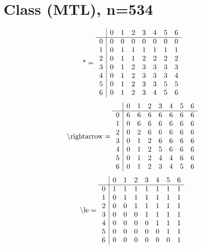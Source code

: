 \documentclass[11pt]{article}
\begin{document}
\section{Class (MTL), n=534}
\[\text{*} = 
\begin{array}{r | r r r r r r r}
 & 0 & 1 & 2 & 3 & 4 & 5 & 6 \\ \hline
0 & 0 & 0 & 0 & 0 & 0 & 0 & 0 \\
1 & 0 & 1 & 1 & 1 & 1 & 1 & 1 \\
2 & 0 & 1 & 1 & 2 & 2 & 2 & 2 \\
3 & 0 & 1 & 2 & 3 & 3 & 3 & 3 \\
4 & 0 & 1 & 2 & 3 & 3 & 3 & 4 \\
5 & 0 & 1 & 2 & 3 & 3 & 5 & 5 \\
6 & 0 & 1 & 2 & 3 & 4 & 5 & 6 \\
\end{array}
\]
\[\text{\textbackslash rightarrow} = 
\begin{array}{r | r r r r r r r}
 & 0 & 1 & 2 & 3 & 4 & 5 & 6 \\ \hline
0 & 6 & 6 & 6 & 6 & 6 & 6 & 6 \\
1 & 0 & 6 & 6 & 6 & 6 & 6 & 6 \\
2 & 0 & 2 & 6 & 6 & 6 & 6 & 6 \\
3 & 0 & 1 & 2 & 6 & 6 & 6 & 6 \\
4 & 0 & 1 & 2 & 5 & 6 & 6 & 6 \\
5 & 0 & 1 & 2 & 4 & 4 & 6 & 6 \\
6 & 0 & 1 & 2 & 3 & 4 & 5 & 6 \\
\end{array}
\]
\[\text{\textbackslash le} = 
\begin{array}{r | r r r r r r r}
 & 0 & 1 & 2 & 3 & 4 & 5 & 6 \\ \hline
0 & 1 & 1 & 1 & 1 & 1 & 1 & 1 \\
1 & 0 & 1 & 1 & 1 & 1 & 1 & 1 \\
2 & 0 & 0 & 1 & 1 & 1 & 1 & 1 \\
3 & 0 & 0 & 0 & 1 & 1 & 1 & 1 \\
4 & 0 & 0 & 0 & 0 & 1 & 1 & 1 \\
5 & 0 & 0 & 0 & 0 & 0 & 1 & 1 \\
6 & 0 & 0 & 0 & 0 & 0 & 0 & 1 \\
\end{array}
\]
\end{document}
